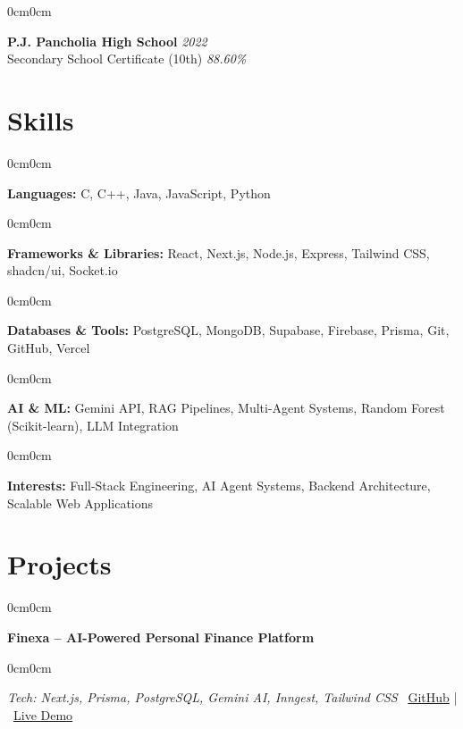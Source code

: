 \documentclass[10pt, letterpaper]{article}
\newenvironment{onecolentry}{
    \begin{adjustwidth}{0cm}{0cm}
}{
    \end{adjustwidth}
}
\begin{document}
\vspace{0.05cm}

\begin{onecolentry}
\textbf{P.J. Pancholia High School} \hfill \textit{2022} \\
Secondary School Certificate (10th) \hfill \textit{88.60\%}
\end{onecolentry}

\section{Skills}

\begin{onecolentry}
\textbf{Languages:} C, C++, Java, JavaScript, Python
\end{onecolentry}

\begin{onecolentry}
\textbf{Frameworks \& Libraries:} React, Next.js, Node.js, Express, Tailwind CSS, shadcn/ui, Socket.io
\end{onecolentry}

\begin{onecolentry}
\textbf{Databases \& Tools:} PostgreSQL, MongoDB, Supabase, Firebase, Prisma, Git, GitHub, Vercel
\end{onecolentry}

\begin{onecolentry}
\textbf{AI \& ML:} Gemini API, RAG Pipelines, Multi-Agent Systems, Random Forest (Scikit-learn), LLM Integration
\end{onecolentry}

\begin{onecolentry}
\textbf{Interests:} Full-Stack Engineering, AI Agent Systems, Backend Architecture, Scalable Web Applications
\end{onecolentry}

\section{Projects}

\begin{onecolentry}
\textbf{Finexa -- AI-Powered Personal Finance Platform}
\end{onecolentry}

\begin{onecolentry}
\textit{Tech: Next.js, Prisma, PostgreSQL, Gemini AI, Inngest, Tailwind CSS} \hfill
{\color{iconGray}\faGithub}~\href{https://github.com/Omkarop0808/Finexa}{GitHub} \;|\;
{\color{linkBlue}\faExternalLinkAlt}~\href{https://finexa-1.vercel.app/}{Live Demo}
\end{onecolentry}
\end{document}
